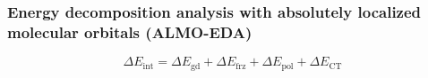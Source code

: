 \documentclass[xcolor=usenames,dvipsnames,svgnames]{beamer}
\begin{document}
\begin{frame}
  \frametitle{Energy decomposition analysis with absolutely localized molecular orbitals (ALMO-EDA)}
  \centering
  \begin{equation*}
    \Delta E_{\text{int}} = \Delta E_{\text{gd}} + \Delta E_{\text{frz}} + \Delta E_{\text{pol}} + \Delta E_{\text{CT}}
  \end{equation*}

\end{frame}
\end{document}
